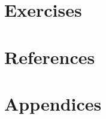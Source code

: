 \documentclass[10pt, a4paper]{report}
\begin{document}


\tableofcontents

\newpage

\newpage
\section{Exercises} \label{sec4}

\newpage

\newpage

\newpage

\newpage

\section{References} \label{sec7}

\newpage
\section{Appendices} \label{sec8}

\end{document}
